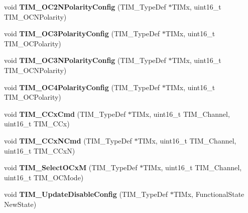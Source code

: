 \begin{DoxyCompactItemize}
\item 
\hypertarget{group__TIM__Exported__Functions_ga2fa6ea3a89f446b52b4e699272b70cad}{
void {\bfseries TIM\_\-OC2NPolarityConfig} (TIM\_\-TypeDef $\ast$TIMx, uint16\_\-t TIM\_\-OCNPolarity)}
\label{group__TIM__Exported__Functions_ga2fa6ea3a89f446b52b4e699272b70cad}

\item 
\hypertarget{group__TIM__Exported__Functions_ga1ef43b03fe666495e80aac9741ae7ab0}{
void {\bfseries TIM\_\-OC3PolarityConfig} (TIM\_\-TypeDef $\ast$TIMx, uint16\_\-t TIM\_\-OCPolarity)}
\label{group__TIM__Exported__Functions_ga1ef43b03fe666495e80aac9741ae7ab0}

\item 
\hypertarget{group__TIM__Exported__Functions_gac710acc5b682e892584fc6f089f61dc2}{
void {\bfseries TIM\_\-OC3NPolarityConfig} (TIM\_\-TypeDef $\ast$TIMx, uint16\_\-t TIM\_\-OCNPolarity)}
\label{group__TIM__Exported__Functions_gac710acc5b682e892584fc6f089f61dc2}

\item 
\hypertarget{group__TIM__Exported__Functions_gad678410f7c7244f83daad93ce9d1056e}{
void {\bfseries TIM\_\-OC4PolarityConfig} (TIM\_\-TypeDef $\ast$TIMx, uint16\_\-t TIM\_\-OCPolarity)}
\label{group__TIM__Exported__Functions_gad678410f7c7244f83daad93ce9d1056e}

\item 
\hypertarget{group__TIM__Exported__Functions_ga3ecc4647d9ede261beb5e0535cf29ebb}{
void {\bfseries TIM\_\-CCxCmd} (TIM\_\-TypeDef $\ast$TIMx, uint16\_\-t TIM\_\-Channel, uint16\_\-t TIM\_\-CCx)}
\label{group__TIM__Exported__Functions_ga3ecc4647d9ede261beb5e0535cf29ebb}

\item 
\hypertarget{group__TIM__Exported__Functions_ga304ff7c8a1615498da749bf2507e9f2b}{
void {\bfseries TIM\_\-CCxNCmd} (TIM\_\-TypeDef $\ast$TIMx, uint16\_\-t TIM\_\-Channel, uint16\_\-t TIM\_\-CCxN)}
\label{group__TIM__Exported__Functions_ga304ff7c8a1615498da749bf2507e9f2b}

\item 
\hypertarget{group__TIM__Exported__Functions_ga83ea0af5a7c1af521236ce5e4d2c42b0}{
void {\bfseries TIM\_\-SelectOCxM} (TIM\_\-TypeDef $\ast$TIMx, uint16\_\-t TIM\_\-Channel, uint16\_\-t TIM\_\-OCMode)}
\label{group__TIM__Exported__Functions_ga83ea0af5a7c1af521236ce5e4d2c42b0}

\item 
\hypertarget{group__TIM__Exported__Functions_gace2384dd33e849a054f61b8e1fc7e7c3}{
void {\bfseries TIM\_\-UpdateDisableConfig} (TIM\_\-TypeDef $\ast$TIMx, FunctionalState NewState)}
\label{group__TIM__Exported__Functions_gace2384dd33e849a054f61b8e1fc7e7c3}


\end{DoxyCompactItemize}
